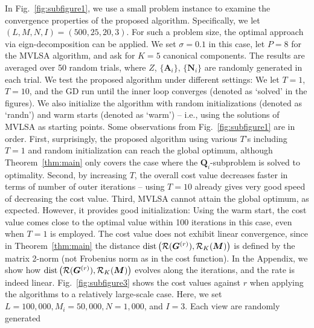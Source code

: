 \documentclass[10pt,journal]{IEEEtran}
\begin{document}
In Fig.~\ref{fig:subfigure1}, we use a small problem instance to examine the convergence properties of the proposed algorithm.
Specifically, we let $(L,M,N,I)=(500,25,20,3)$. For such a problem size, the optimal approach via eign-decomposition can be applied.
We set $\sigma=0.1$ in this case, let $P=8$ for the MVLSA algorithm, and ask for $K=5$ canonical components.
The results are averaged over 50 random trials, where $Z$, $\{{\bm A}_i\}$, $\{{\bm N}_i\}$ are randomly generated in each trial.
We test the proposed algorithm under different settings:
We let $T=1$, $T=10$, and the GD run until the inner loop converges (denoted as `solved' in the figures).
We also initialize the algorithm with random initializations (denoted as `randn') and warm starts (denoted as `warm') -- i.e., using the solutions of MVLSA as starting points. 
Some observations from Fig.~\ref{fig:subfigure1} are in order. 
First, surprisingly, the proposed algorithm using various $T$'s including $T=1$ and random initialization can reach the global optimum, although Theorem~\ref{thm:main}
only covers the case where the ${\bm Q}_i$-subproblem is solved to optimality.
Second, by increasing $T$, the overall cost value decreases faster in terms of number of outer iterations -- using $T=10$ already gives very good speed of decreasing the cost value.
Third, MVLSA cannot attain the global optimum, as expected. However, it provides good initialization: Using the warm start, the cost value comes close to the optimal value within 100 iterations in this case, even when $T=1$ is employed.
The cost value does not exhibit linear convergence, since in Theorem~\ref{thm:main} the distance ${\rm dist}\left({\cal R}({\bm G}^{(r)}),{\cal R}_K({\bm M})\right)$ is defined by the matrix 2-norm (not Frobenius norm as in the cost function).
In the Appendix, we show how ${\rm dist}\left({\cal R}({\bm G}^{(r)}),{\cal R}_K({\bm M})\right)$ evolves along the iterations, and the rate is indeed linear.
Fig.~\ref{fig:subfigure3} shows the cost values against $r$ when applying the algorithms to a relatively large-scale case. Here, we set $L=100,000,M_i=50,000,N=1,000$, and $I=3$. Each view are randomly generated
\end{document}
